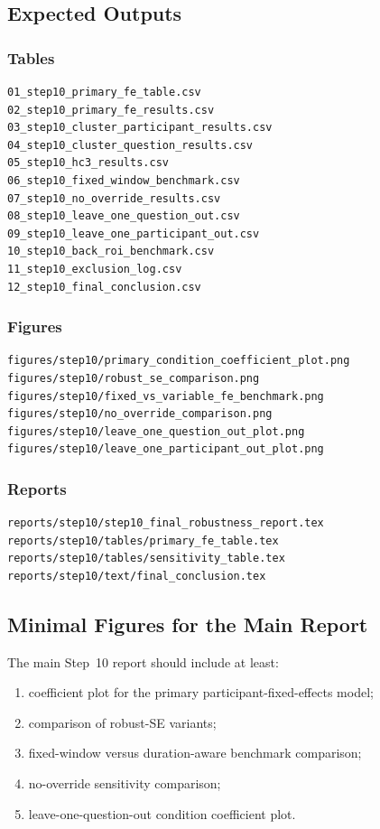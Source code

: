 \subsection{Expected Outputs}

\subsubsection*{Tables}
\begin{verbatim}
01_step10_primary_fe_table.csv
02_step10_primary_fe_results.csv
03_step10_cluster_participant_results.csv
04_step10_cluster_question_results.csv
05_step10_hc3_results.csv
06_step10_fixed_window_benchmark.csv
07_step10_no_override_results.csv
08_step10_leave_one_question_out.csv
09_step10_leave_one_participant_out.csv
10_step10_back_roi_benchmark.csv
11_step10_exclusion_log.csv
12_step10_final_conclusion.csv
\end{verbatim}

\subsubsection*{Figures}
\begin{verbatim}
figures/step10/primary_condition_coefficient_plot.png
figures/step10/robust_se_comparison.png
figures/step10/fixed_vs_variable_fe_benchmark.png
figures/step10/no_override_comparison.png
figures/step10/leave_one_question_out_plot.png
figures/step10/leave_one_participant_out_plot.png
\end{verbatim}

\subsubsection*{Reports}
\begin{verbatim}
reports/step10/step10_final_robustness_report.tex
reports/step10/tables/primary_fe_table.tex
reports/step10/tables/sensitivity_table.tex
reports/step10/text/final_conclusion.tex
\end{verbatim}

\subsection{Minimal Figures for the Main Report}
The main Step~10 report should include at least:
\begin{enumerate}
    \item coefficient plot for the primary participant-fixed-effects model;
    \item comparison of robust-SE variants;
    \item fixed-window versus duration-aware benchmark comparison;
    \item no-override sensitivity comparison;
    \item leave-one-question-out condition coefficient plot.
\end{enumerate}

